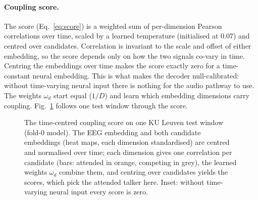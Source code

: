 \documentclass[10pt,twocolumn,letterpaper]{article}
\begin{document}
\paragraph{Coupling score.} The score (Eq.~\ref{eq:score}) is a weighted sum of
per-dimension Pearson correlations over time, scaled by a learned temperature (initialised
at 0.07) and centred over candidates. Correlation is invariant to the scale and offset of
either embedding, so the score depends only on how the two signals co-vary in time.
Centring the embeddings over time makes the score exactly zero for a time-constant neural
embedding. This is what makes the decoder null-calibrated: without time-varying neural
input there is nothing for the audio pathway to use. The weights $\omega_d$ start equal
($1/D$) and learn which embedding dimensions carry coupling. Fig.~\ref{fig:net_coupling}
follows one test window through the score.

\begin{figure}[t]\centering
\resizebox{\textwidth}{!}{}
\caption{The time-centred coupling score on one KU Leuven test window (fold-0 model). The
EEG embedding and both candidate embeddings (heat maps, each dimension standardised) are
centred and normalised over time; each dimension gives one correlation per candidate
(bars: attended in orange, competing in grey), the learned weights $\omega_d$ combine them, and
centring over candidates yields the scores, which pick the attended talker here. Inset:
without time-varying neural input every score is zero.}\label{fig:net_coupling}
\end{figure}
\end{document}
